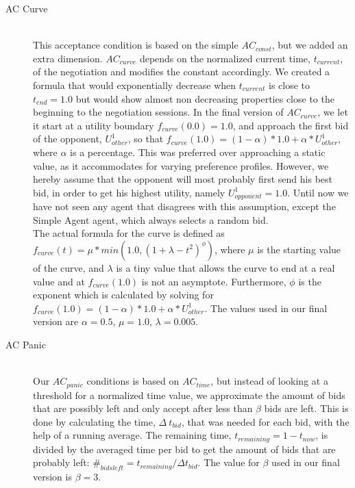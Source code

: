 \begin{description}
  \item[AC Curve] \hfill \\
This acceptance condition is based on the simple $AC_{const}$\cite{baarslag2013acceptance}, but we added an extra dimension. $AC_{curve}$ depends on the normalized current time, $t_{current}$, of the negotiation and modifies the constant accordingly. We created a formula that would exponentially decrease when $t_{current}$ is close to $t_{end} = 1.0$ but would show almost non decreasing properties close to the beginning to the negotiation sessions. In the final version of $AC_{curve}$, we let it start at a utility boundary $f_{curve}(0.0) = 1.0$, and approach the first bid of the opponent, $U_{other}^{1}$, so that $f_{curve}(1.0) = (1 - \alpha) * 1.0 + \alpha * U_{other}^{1}$, where $\alpha$ is a percentage. This was preferred over approaching a static value, as it accommodates for varying preference profiles. However, we hereby assume that the opponent will most probably first send his best bid, in order to get his highest utility, namely $U_{opponent}^{1} = 1.0$. Until now we have not seen any agent that disagrees with this assumption, except the Simple Agent agent, which always selects a random bid. \\

The actual formula for the curve is defined as $f_{curve}(t) = \mu * min(1.0, (1 + \lambda - t^2)^{\phi})$, where $\mu$ is the starting value of the curve, and $\lambda$ is a tiny value that allows the curve to end at a real value and at $f_{curve}(1.0)$ is not an asymptote. Furthermore, $\phi$ is the exponent which is calculated by solving for $f_{curve}(1.0) = (1 - \alpha) * 1.0 + \alpha * U_{other}^{1}$. The values used in our final version are $\alpha = 0.5$, $\mu = 1.0$, $\lambda = 0.005$.

  \item[AC Panic] \hfill \\
Our $AC_{panic}$ conditions is based on $AC_{time}$\cite{baarslag2013acceptance}, but instead of looking at a threshold for a normalized time value, we approximate the amount of bids that are possibly left and only accept after less than $\beta$ bids are left. This is done by calculating the time, $\Delta~t_{bid}$, that was needed for each bid, with the help of a running average. The remaining time, $t_{remaining} = 1 - t_{now}$, is divided by the averaged time per bid to get the amount of bids that are probably left: $\#_{bids left} = t_{remaining} / \Delta t_{bid}$. The value for $\beta$ used in our final version is $\beta = 3$.\\


\end{description}
